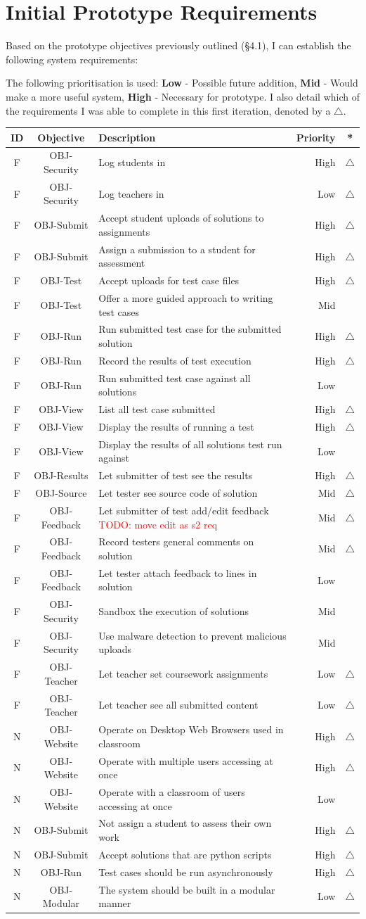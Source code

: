 \documentclass[a4paper,11pt]{report}
\newcommand{\todo}[1]{\textcolor{red}{TODO: #1}}
\newcounter{FunCount}
\newcounter{NFunCount}
\newcommand{\freq}[4]{\addtocounter{FunCount}{1}F\arabic{FunCount} & OBJ-#1 & #2 & #3 & #4\\}
\newcommand{\nfreq}[4]{\addtocounter{NFunCount}{1}N\arabic{NFunCount} & OBJ-#1 & #2 & #3 & #4\\}
\begin{document}
\section{Initial Prototype Requirements}
Based on the  prototype objectives previously outlined (\S4.1), I can establish the following system requirements:\par
The following prioritisation is used: \textbf{Low} - Possible future addition, \textbf{Mid} - Would make a more useful system, \textbf{High} - Necessary for prototype.
I also detail which of the requirements I was able to complete in this first iteration, denoted by a $\bigtriangleup$.
\begin{longtable}{cclrc}
\textbf{ID} & \textbf{Objective} & \textbf{Description} & \textbf{Priority} & \textbf{*} \\\hline
\freq{Security}{Log students in}{High}{$\bigtriangleup$}
\freq{Security}{Log teachers in}{Low}{$\bigtriangleup$}
\freq{Submit}{Accept student uploads of solutions to assignments}{High}{$\bigtriangleup$}
\freq{Submit}{Assign a submission to a student for assessment}{High}{$\bigtriangleup$}
\freq{Test}{Accept uploads for test case files}{High}{$\bigtriangleup$}
\freq{Test}{Offer a more guided approach to writing test cases}{Mid}{}
\freq{Run}{Run submitted test case for the submitted solution}{High}{$\bigtriangleup$}
\freq{Run}{Record the results of test execution}{High}{$\bigtriangleup$}
\freq{Run}{Run submitted test case against all solutions}{Low}{}
\freq{View}{List all test case submitted}{High}{$\bigtriangleup$}
\freq{View}{Display the results of running a test}{High}{$\bigtriangleup$}
\freq{View}{Display the results of all solutions test run against}{Low}{}
\freq{Results}{Let submitter of test see the results}{High}{$\bigtriangleup$}
\freq{Source}{Let tester see source code of solution}{Mid}{$\bigtriangleup$}
\freq{Feedback}{Let submitter of test add/edit feedback \todo{move edit as s2 req}}{Mid}{$\bigtriangleup$}
\freq{Feedback}{Record testers general comments on solution}{Mid}{$\bigtriangleup$}
\freq{Feedback}{Let tester attach feedback to lines in solution}{Low}{}
\freq{Security}{Sandbox the execution of solutions}{Mid}{}
\freq{Security}{Use malware detection to prevent malicious uploads}{Mid}{}
\freq{Teacher}{Let teacher set coursework assignments}{Low}{$\bigtriangleup$}
\freq{Teacher}{Let teacher see all submitted content}{Low}{$\bigtriangleup$}
\nfreq{Website}{Operate on Desktop Web Browsers used in classroom}{High}{$\bigtriangleup$}
\nfreq{Website}{Operate with multiple users accessing at once}{High}{$\bigtriangleup$}
\nfreq{Website}{Operate with a classroom of users accessing at once}{Low}{}
\nfreq{Submit}{Not assign a student to assess their own work}{High}{$\bigtriangleup$}
\nfreq{Submit}{Accept solutions that are python scripts}{High}{$\bigtriangleup$}
\nfreq{Run}{Test cases should be run asynchronously}{High}{$\bigtriangleup$}
\nfreq{Modular}{The system should be built in a modular manner}{Low}{$\bigtriangleup$}
\end{longtable}
\end{document}
